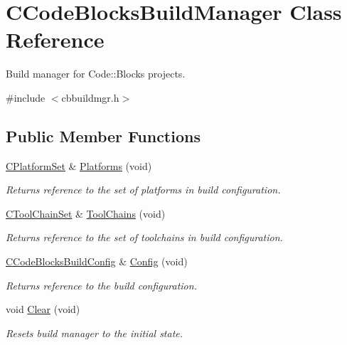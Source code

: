 \hypertarget{classCCodeBlocksBuildManager}{\section{C\-Code\-Blocks\-Build\-Manager Class Reference}
\label{classCCodeBlocksBuildManager}
}


Build manager for Code\-::\-Blocks projects.  




{\ttfamily \#include $<$cbbuildmgr.\-h$>$}

\subsection*{Public Member Functions}
\begin{DoxyCompactItemize}
\item 
\hyperlink{classCPlatformSet}{C\-Platform\-Set} \& \hyperlink{classCCodeBlocksBuildManager_acaeb1798ff6294c2b9300b686d677d5e}{Platforms} (void)
\begin{DoxyCompactList}\small\item\em Returns reference to the set of platforms in build configuration. \end{DoxyCompactList}\item 
\hyperlink{classCToolChainSet}{C\-Tool\-Chain\-Set} \& \hyperlink{classCCodeBlocksBuildManager_aeba3ee360b7989935296b0e4199d62ef}{Tool\-Chains} (void)
\begin{DoxyCompactList}\small\item\em Returns reference to the set of toolchains in build configuration. \end{DoxyCompactList}\item 
\hyperlink{classCCodeBlocksBuildConfig}{C\-Code\-Blocks\-Build\-Config} \& \hyperlink{classCCodeBlocksBuildManager_a0dac91d06d68b934520a54989ff2fb71}{Config} (void)
\begin{DoxyCompactList}\small\item\em Returns reference to the build configuration. \end{DoxyCompactList}\item 
void \hyperlink{classCCodeBlocksBuildManager_a21431e3db6667b349a9a25e02a59c47a}{Clear} (void)
\begin{DoxyCompactList}\small\item\em Resets build manager to the initial state. \end{DoxyCompactList}\item 

\end{DoxyCompactItemize}
